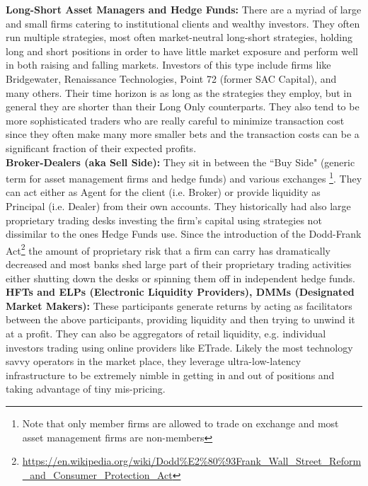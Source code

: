 \noindent\textbf{ Long-Short Asset Managers and Hedge Funds:} There are a myriad of large and small firms catering to institutional clients and wealthy investors. They often run multiple strategies, most often market-neutral long-short strategies, holding long and short positions in order to have little market exposure and  perform well in both raising and falling markets. Investors of this type include firms like Bridgewater, Renaissance Technologies, Point 72 (former SAC Capital), and many others. Their time horizon is as long as the strategies they employ, but in general they are shorter than their Long Only counterparts. They also tend to be more sophisticated traders who are really careful to minimize transaction cost since they often make many more smaller bets and the transaction costs can be a significant fraction of their expected profits. \\


\noindent\textbf{Broker-Dealers (aka Sell Side):} They sit in between the ``Buy Side" (generic term for asset management firms and hedge funds) and various exchanges \footnote{Note that only member firms are allowed to trade on exchange and most asset management firms are non-members}. They can act either as Agent for the client (i.e. Broker) or provide liquidity as Principal (i.e. Dealer) from their own accounts. They historically had  also large proprietary trading desks investing the firm's capital using strategies not dissimilar to the ones Hedge Funds use. Since the introduction of the Dodd-Frank Act\footnote{\url{https://en.wikipedia.org/wiki/Dodd\%E2\%80\%93Frank_Wall_Street_Reform_and_Consumer_Protection_Act}} the amount of proprietary risk that a firm can carry has dramatically decreased and most banks shed large part of their proprietary trading activities either shutting down the desks or spinning them off in independent hedge funds. \\


\noindent\textbf{HFTs and ELPs (Electronic Liquidity Providers), DMMs (Designated Market Makers):} These participants generate returns by acting as facilitators between the above participants, providing liquidity and then trying to unwind it at a profit. They can also be aggregators of retail liquidity, e.g. individual investors trading using online providers like ETrade. Likely the most technology savvy operators in the market place, they leverage ultra-low-latency infrastructure to be extremely nimble in getting in and out of positions and taking advantage of tiny mis-pricing. 

